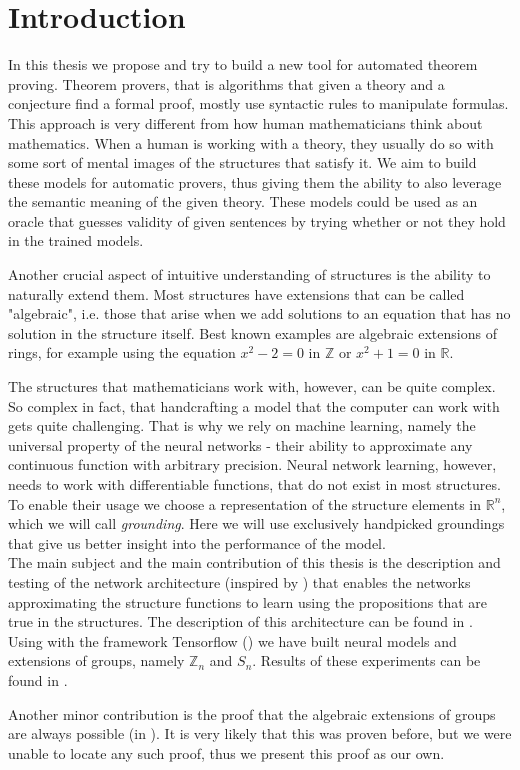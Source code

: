 \chapter*{Introduction}
\label{intro}

In this thesis we propose and try to build a new tool for automated theorem proving. Theorem provers, that is algorithms that given a theory and a conjecture find a formal proof, mostly use syntactic rules to manipulate formulas. This approach is very different from how human mathematicians think about mathematics. When a human is working with a theory, they usually do so with some sort of mental images of the structures that satisfy it. We aim to build these models for automatic provers, thus giving them the ability to also leverage the semantic meaning of the given theory. These models could be used as an oracle that guesses validity of given sentences by trying whether or not they hold in the trained models.

Another crucial aspect of intuitive understanding of structures is the ability to naturally extend them. Most structures have extensions that can be called "algebraic", i.e. those that arise when we add solutions to an equation that has no solution in the structure itself. Best known examples are algebraic extensions of rings, for example using the equation $x^2-2=0$ in $\mathbb{Z}$ or $x^2+1=0$ in $\mathbb{R}$.

The structures that mathematicians work with, however, can be quite complex. So complex in fact, that handcrafting a model that the computer can work with gets quite challenging. That is why we rely on machine learning, namely the universal property of the neural networks - their ability to approximate any continuous function with arbitrary precision. Neural network learning, however, needs to work with differentiable functions, that do not exist in most structures. To enable their usage we choose a representation of the structure elements in $\mathbb{R}^n$, which we will call \textit{grounding}. Here we will use exclusively handpicked groundings that give us better insight into the performance of the model.\\

The main subject and the main contribution of this thesis is the description and testing of the network architecture (inspired by \cite{serafini}) that enables the networks approximating the structure functions to learn using the propositions that are true in the structures. The description of this architecture can be found in . Using with the framework Tensorflow (\cite{tf}) we have built neural models and extensions of groups, namely $\mathbb{Z}_n$ and $S_n$. Results of these experiments can be found in .

Another minor contribution is the proof that the algebraic extensions of groups are always possible (in ). It is very likely that this was proven before, but we were unable to locate any such proof, thus we present this proof as our own.